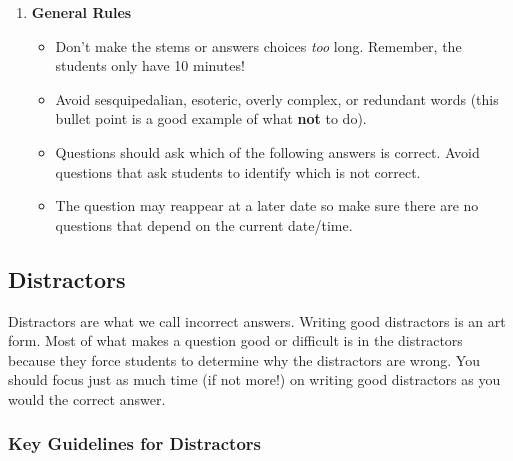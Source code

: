 \documentclass[
]{article}
\providecommand{\tightlist}{%
  \setlength{\itemsep}{0pt}\setlength{\parskip}{0pt}}
\begin{document}
\begin{enumerate}
\def\labelenumi{\arabic{enumi}.}
\setcounter{enumi}{5}
\tightlist
\item
  \textbf{General Rules}

  \begin{itemize}
  \tightlist
  \item
    Don't make the stems or answers choices \emph{too} long. Remember, the students only have 10 minutes!
  \item
    Avoid sesquipedalian, esoteric, overly complex, or redundant words (this bullet point is a good example of what \textbf{not} to do).
  \item
    Questions should ask which of the following answers is correct. Avoid questions that ask students to identify which is not correct.
  \item
    The question may reappear at a later date so make sure there are no questions that depend on the current date/time.
  \end{itemize}
\end{enumerate}

\hypertarget{distractors}{%
\subsection{Distractors}\label{distractors}}

Distractors are what we call incorrect answers. Writing good distractors is an art form. Most of what makes a question good or difficult is in the distractors because they force students to determine why the distractors are wrong. You should focus just as much time (if not more!) on writing good distractors as you would the correct answer.

\hypertarget{key-guidelines-for-distractors}{%
\subsubsection{Key Guidelines for Distractors}\label{key-guidelines-for-distractors}}
\end{document}
